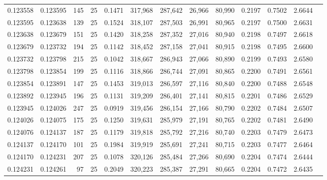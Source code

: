 \begin{tabular}{rrrrrrrrrrrrr}
0.123558 & 0.123595 &   145 &  25 &                                     0.1471 & 317,968 & 287,642 &  26,966 &  80,990 & 0.2197 & 0.7502 & 2.6644 \\
0.123595 & 0.123638 &   139 &  25 &                                     0.1524 & 318,107 & 287,503 &  26,991 &  80,965 & 0.2197 & 0.7500 & 2.6631 \\
0.123638 & 0.123679 &   151 &  25 &                                     0.1420 & 318,258 & 287,352 &  27,016 &  80,940 & 0.2198 & 0.7497 & 2.6618 \\
0.123679 & 0.123732 &   194 &  25 &                                     0.1142 & 318,452 & 287,158 &  27,041 &  80,915 & 0.2198 & 0.7495 & 2.6600 \\
0.123732 & 0.123798 &   215 &  25 &                                     0.1042 & 318,667 & 286,943 &  27,066 &  80,890 & 0.2199 & 0.7493 & 2.6580 \\
0.123798 & 0.123854 &   199 &  25 &                                     0.1116 & 318,866 & 286,744 &  27,091 &  80,865 & 0.2200 & 0.7491 & 2.6561 \\
0.123854 & 0.123891 &   147 &  25 &                                     0.1453 & 319,013 & 286,597 &  27,116 &  80,840 & 0.2200 & 0.7488 & 2.6548 \\
0.123892 & 0.123945 &   196 &  25 &                                     0.1131 & 319,209 & 286,401 &  27,141 &  80,815 & 0.2201 & 0.7486 & 2.6529 \\
0.123945 & 0.124026 &   247 &  25 &                                     0.0919 & 319,456 & 286,154 &  27,166 &  80,790 & 0.2202 & 0.7484 & 2.6507 \\
0.124026 & 0.124075 &   175 &  25 &                                     0.1250 & 319,631 & 285,979 &  27,191 &  80,765 & 0.2202 & 0.7481 & 2.6490 \\
0.124076 & 0.124137 &   187 &  25 &                                     0.1179 & 319,818 & 285,792 &  27,216 &  80,740 & 0.2203 & 0.7479 & 2.6473 \\
0.124137 & 0.124170 &   101 &  25 &                                     0.1984 & 319,919 & 285,691 &  27,241 &  80,715 & 0.2203 & 0.7477 & 2.6464 \\
0.124170 & 0.124231 &   207 &  25 &                                     0.1078 & 320,126 & 285,484 &  27,266 &  80,690 & 0.2204 & 0.7474 & 2.6444 \\
0.124231 & 0.124261 &    97 &  25 &                                     0.2049 & 320,223 & 285,387 &  27,291 &  80,665 & 0.2204 & 0.7472 & 2.6435 \\

\end{tabular}
